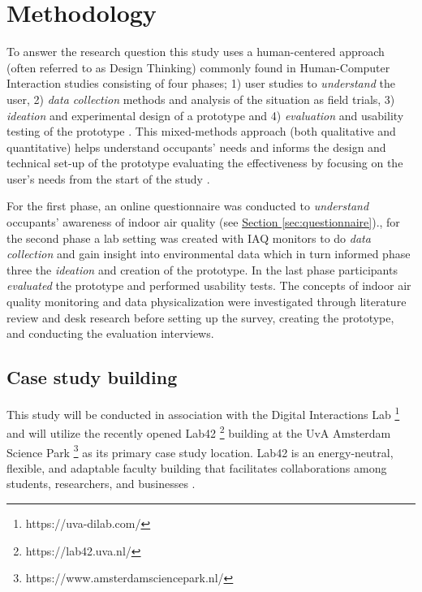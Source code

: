\section{Methodology}
\label{sec:methodology}

To answer the research question this study uses a human-centered approach (often referred to as Design Thinking) commonly found in Human-Computer Interaction studies consisting of four phases; 1) user studies to \textit{understand} the user, 2) \textit{data collection} methods and analysis of the situation as field trials, 3) \textit{ideation} and experimental design of a prototype and 4) \textit{evaluation} and usability testing of the prototype \cite{jonathan_lazar_research_2017, zimmerman_research_2007}. This mixed-methods approach (both qualitative and quantitative)  helps understand occupants' needs and informs the design and technical set-up of the prototype evaluating the effectiveness by focusing on the user's needs from the start of the study \cite{rogers_moving_2017}. 

For the first phase, an online questionnaire was conducted to \textit{understand} occupants' awareness of indoor air quality (see \hyperref[sec:questionnaire]{Section \ref*{sec:questionnaire}})., for the second phase a lab setting was created with IAQ monitors to do \textit{data collection} and gain insight into environmental data which in turn informed phase three the \textit{ideation} and creation of the prototype. In the last phase participants \textit{evaluated} the prototype and performed usability tests. The concepts of indoor air quality monitoring and data physicalization were investigated through literature review and desk research before setting up the survey, creating the prototype, and conducting the evaluation interviews.

\subsection{Case study building}

This study will be conducted in association with the Digital Interactions Lab \footnote{https://uva-dilab.com/} and will utilize the recently opened Lab42 \footnote{https://lab42.uva.nl/} building at the UvA Amsterdam Science Park \footnote{https://www.amsterdamsciencepark.nl/} as its primary case study location. Lab42 is an energy-neutral, flexible, and adaptable faculty building that facilitates collaborations among students, researchers, and businesses \cite{benthem_2022}. 

